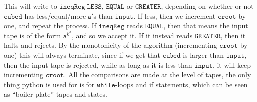 \documentclass[11pt,a4paper]{article}
\begin{document}
This will write to $\texttt{ineqReg}$ $\texttt{LESS, EQUAL}$ or $\texttt{GREATER}$,
depending on whether or not $\texttt{cubed}$ has less/equal/more $\texttt{a}'$s than 
$\texttt{input}$. If less, then we increment $\texttt{croot}$ by one, and
repeat the process. If $\texttt{ineqReg}$ reads $\texttt{EQUAL}$, then that
means the  input tape is of the form  $\texttt{a}^{k^{3}}$, and so we accept
it. If it instead reads $\texttt{GREATER}$, then it halts and rejects. By the
monotonicity of the algorithm (incrementing $\texttt{croot}$ by one) this will
always terminate, since if we get that $\texttt{cubed}$ is larger than $\texttt{input}$, then the input tape is rejected, while as long as it is less than $\texttt{input}$, it will keep incrementing $\texttt{croot}$. All the comparisons are made at the level of tapes, the only thing python is used for is for $\texttt{while}$-loops and if statements, which can be seen as ``boiler-plate'' tapes and states.
\end{document}
